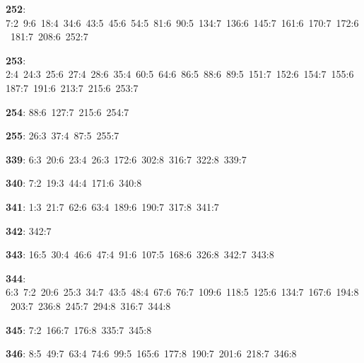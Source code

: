 \noindent \textbf{252}: 7:2\allowbreak\ 9:6\allowbreak\ 18:4\allowbreak\ 34:6\allowbreak\ 43:5\allowbreak\ 45:6\allowbreak\ 54:5\allowbreak\ 81:6\allowbreak\ 90:5\allowbreak\ 134:7\allowbreak\ 136:6\allowbreak\ 145:7\allowbreak\ 161:6\allowbreak\ 170:7\allowbreak\ 172:6\allowbreak\ 181:7\allowbreak\ 208:6\allowbreak\ 252:7\par
\noindent \textbf{253}: 2:4\allowbreak\ 24:3\allowbreak\ 25:6\allowbreak\ 27:4\allowbreak\ 28:6\allowbreak\ 35:4\allowbreak\ 60:5\allowbreak\ 64:6\allowbreak\ 86:5\allowbreak\ 88:6\allowbreak\ 89:5\allowbreak\ 151:7\allowbreak\ 152:6\allowbreak\ 154:7\allowbreak\ 155:6\allowbreak\ 187:7\allowbreak\ 191:6\allowbreak\ 213:7\allowbreak\ 215:6\allowbreak\ 253:7\par
\noindent \textbf{254}: 88:6\allowbreak\ 127:7\allowbreak\ 215:6\allowbreak\ 254:7\par
\noindent \textbf{255}: 26:3\allowbreak\ 37:4\allowbreak\ 87:5\allowbreak\ 255:7\par
\noindent \textbf{339}: 6:3\allowbreak\ 20:6\allowbreak\ 23:4\allowbreak\ 26:3\allowbreak\ 172:6\allowbreak\ 302:8\allowbreak\ 316:7\allowbreak\ 322:8\allowbreak\ 339:7\par
\noindent \textbf{340}: 7:2\allowbreak\ 19:3\allowbreak\ 44:4\allowbreak\ 171:6\allowbreak\ 340:8\par
\noindent \textbf{341}: 1:3\allowbreak\ 21:7\allowbreak\ 62:6\allowbreak\ 63:4\allowbreak\ 189:6\allowbreak\ 190:7\allowbreak\ 317:8\allowbreak\ 341:7\par
\noindent \textbf{342}: 342:7\par
\noindent \textbf{343}: 16:5\allowbreak\ 30:4\allowbreak\ 46:6\allowbreak\ 47:4\allowbreak\ 91:6\allowbreak\ 107:5\allowbreak\ 168:6\allowbreak\ 326:8\allowbreak\ 342:7\allowbreak\ 343:8\par
\noindent \textbf{344}: 6:3\allowbreak\ 7:2\allowbreak\ 20:6\allowbreak\ 25:3\allowbreak\ 34:7\allowbreak\ 43:5\allowbreak\ 48:4\allowbreak\ 67:6\allowbreak\ 76:7\allowbreak\ 109:6\allowbreak\ 118:5\allowbreak\ 125:6\allowbreak\ 134:7\allowbreak\ 167:6\allowbreak\ 194:8\allowbreak\ 203:7\allowbreak\ 236:8\allowbreak\ 245:7\allowbreak\ 294:8\allowbreak\ 316:7\allowbreak\ 344:8\par
\noindent \textbf{345}: 7:2\allowbreak\ 166:7\allowbreak\ 176:8\allowbreak\ 335:7\allowbreak\ 345:8\par
\noindent \textbf{346}: 8:5\allowbreak\ 49:7\allowbreak\ 63:4\allowbreak\ 74:6\allowbreak\ 99:5\allowbreak\ 165:6\allowbreak\ 177:8\allowbreak\ 190:7\allowbreak\ 201:6\allowbreak\ 218:7\allowbreak\ 346:8\par
